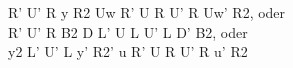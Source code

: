 R' U' R y R2 Uw R' U R U' R Uw' R2, oder\\
R' U' R B2 D L' U L U' L D' B2, oder\\
y2 L' U' L y' R2' u R' U R U' R u' R2\\
